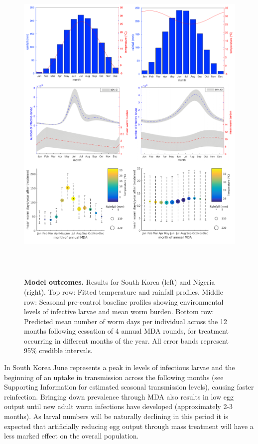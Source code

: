 \begin{figure}[!h]
\includegraphics[height=16cm]{Project/Figures/STH/Fig5.pdf}
\caption{{\bf Model outcomes.}
Results for South Korea (left) and Nigeria (right). Top row: Fitted temperature and rainfall profiles. Middle row: Seasonal pre-control baseline profiles showing environmental levels of infective larvae and mean worm burden. Bottom row: Predicted mean number of worm days per individual across the 12 months following cessation of 4 annual MDA rounds, for treatment occurring in different months of the year. All error bands represent 95\% credible intervals.}
\label{Fig5}
\end{figure} 

In South Korea June represents a peak in levels of infectious larvae and the beginning of an uptake in transmission across the following months (see Supporting Information for estimated seasonal transmission levels), causing faster reinfection. Bringing down prevalence through MDA also results in low egg output until new adult worm infections have developed (approximately 2-3 months). As larval numbers will be naturally declining in this period it is expected that artificially reducing egg output through mass treatment will have a less marked effect on the overall population.

